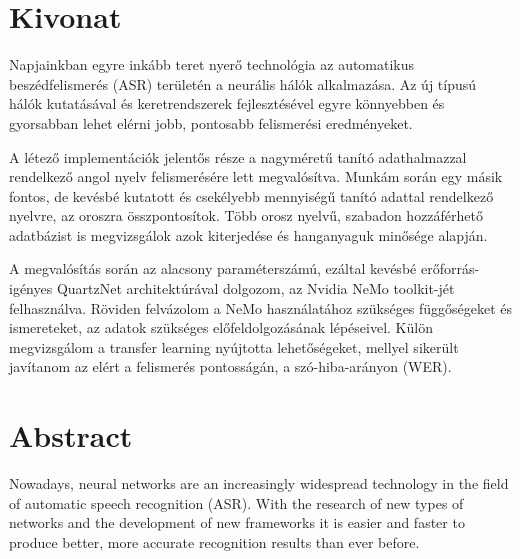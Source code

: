 \setcounter{page}{1}

\selecthungarian

\chapter*{Kivonat}

Napjainkban egyre inkább teret nyerő technológia az automatikus beszédfelismerés (ASR) területén a neurális hálók alkalmazása. Az új típusú hálók kutatásával és keretrendszerek fejlesztésével egyre könnyebben és gyorsabban lehet elérni jobb, pontosabb felismerési eredményeket.

A létező implementációk jelentős része a nagyméretű tanító adathalmazzal rendelkező angol nyelv felismerésére lett megvalósítva. Munkám során egy másik fontos, de kevésbé kutatott és csekélyebb mennyiségű tanító adattal rendelkező nyelvre, az oroszra összpontosítok. Több orosz nyelvű, szabadon hozzáférhető adatbázist is megvizsgálok azok kiterjedése és hanganyaguk minősége alapján.

A megvalósítás során az alacsony paraméterszámú, ezáltal kevésbé erőforrás-igényes QuartzNet architektúrával dolgozom, az Nvidia NeMo toolkit-jét felhasználva. Röviden felvázolom a NeMo használatához szükséges függőségeket és ismereteket, az adatok szükséges előfeldolgozásának lépéseivel. Külön megvizsgálom a transfer learning nyújtotta lehetőségeket, mellyel sikerült javítanom az elért a felismerés pontosságán, a szó-hiba-arányon (WER).

\vfill
\selectenglish


\chapter*{Abstract}

Nowadays, neural networks are an increasingly widespread technology in the field of automatic speech recognition (ASR). With the research of new types of networks and the development of new frameworks it is easier and faster to produce better, more accurate recognition results than ever before.


